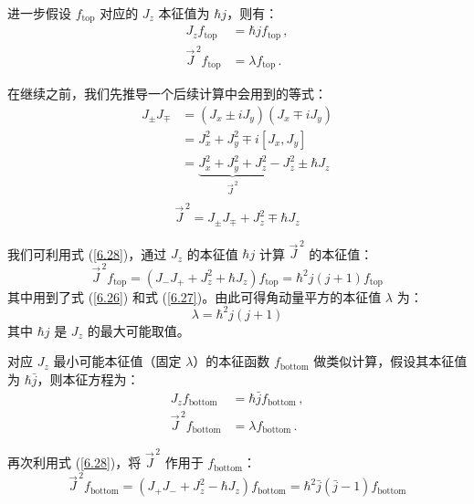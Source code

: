 进一步假设 \(f_{\text{top}}\) 对应的 \(J_z\) 本征值为 \(\hbar j\)，则有：
\begin{equation}
	\begin{aligned}
		J_z f_{\text{top}} &= \hbar j f_{\text{top}} \,, \\
		\vec{J}^{\,2} f_{\text{top}} &= \lambda f_{\text{top}} \,.
	\end{aligned} \label{6.27}
\end{equation}

在继续之前，我们先推导一个后续计算中会用到的等式：
\[
\begin{aligned}
	J_\pm J_\mp &= (J_x \pm i J_y)(J_x \mp i J_y) \\
	&= J_x^2 + J_y^2 \mp i [J_x, J_y] \\
	&= \underbrace{J_x^2 + J_y^2 + J_z^2 }_{\vec{J}^{\,2}}- J_z^2 \pm \hbar J_z \\
\end{aligned} 
\]
\begin{equation}
	\boxed{\vec{J}^{\,2} = J_\pm J_\mp + J_z^2 \mp \hbar J_z \label{6.28}} 
\end{equation}


我们可利用式 (\ref{6.28})，通过 \(J_z\) 的本征值 \(\hbar j\) 计算 \(\vec{J}^{\,2}\) 的本征值：
\begin{equation}
	\vec{J}^{\,2} f_{\text{top}} = (J_- J_+ + J_z^2 + \hbar J_z) f_{\text{top}} = \hbar^2 j(j + 1) f_{\text{top}} \label{6.29}
\end{equation}
其中用到了式 (\ref{6.26}) 和式 (\ref{6.27})。由此可得角动量平方的本征值 \(\lambda\) 为：
\begin{equation}
	\lambda = \hbar^2 j(j + 1) \label{6.30}
\end{equation}
其中 \(\hbar j\) 是 \(J_z\) 的最大可能取值。

对应 \(J_z\) 最小可能本征值（固定 \(\lambda\)）的本征函数 \(f_{\text{bottom}}\) 做类似计算，假设其本征值为 \(\hbar \bar{j}\)，则本征方程为：
\begin{equation}
	\begin{aligned}
		J_z f_{\text{bottom}} &= \hbar \bar{j} f_{\text{bottom}} \,, \\
		\vec{J}^{\,2} f_{\text{bottom}} &= \lambda f_{\text{bottom}} \,.
	\end{aligned} \label{6.31}
\end{equation}

再次利用式 (\ref{6.28})，将 \(\vec{J}^{\,2}\) 作用于 \(f_{\text{bottom}}\)：
\begin{equation}
	\vec{J}^{\,2} f_{\text{bottom}} = (J_+ J_- + J_z^2 - \hbar J_z) f_{\text{bottom}} = \hbar^2 \bar{j}(\bar{j} - 1) f_{\text{bottom}} \label{6.32}
\end{equation}

